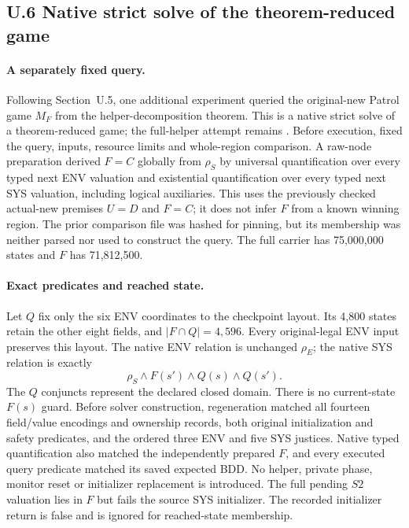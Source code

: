 \subsection*{U.6 Native strict solve of the theorem-reduced game}
\label{supp:native-reduced-query}

\paragraph{A separately fixed query.}
Following Section~U.5, one additional experiment queried the original-new
Patrol game $M_F$ from the helper-decomposition theorem. This is a native
strict solve of a theorem-reduced game; the full-helper attempt remains
. Before execution,  fixed the query, inputs,
resource limits and whole-region comparison. A raw-node preparation derived
$F=C$ globally from $\rho_S$ by universal quantification over every typed
next ENV valuation and existential quantification over every typed next
SYS valuation, including logical auxiliaries. This uses the previously
checked actual-new premises $U=D$ and $F=C$; it does not infer $F$ from a
known winning region. The prior comparison file was hashed for pinning,
but its membership was neither parsed nor used to construct the query.
The full carrier has 75,000,000 states and $F$ has 71,812,500.

\paragraph{Exact predicates and reached state.}
Let $Q$ fix only the six ENV coordinates to the checkpoint layout. Its
4,800 states retain the other eight fields, and $|F\cap Q|=4,596$.
Every original-legal ENV input preserves this layout. The native ENV
relation is unchanged $\rho_E$; the native SYS relation is exactly
\[
  \rho_S\land F(s')\land Q(s)\land Q(s').
\]
The $Q$ conjuncts represent the declared closed domain. There is no
current-state $F(s)$ guard. Before solver construction, regeneration
matched all fourteen field/value encodings and ownership records, both
original initialization and safety predicates, and the ordered three ENV
and five SYS justices. Native typed quantification also matched the
independently prepared $F$, and every executed query predicate matched its
saved expected BDD. No helper, private phase, monitor reset or initializer
replacement is introduced. The full pending $S2$ valuation lies in $F$
but fails the source SYS initializer. The recorded initializer return
is false and is ignored for reached-state membership.

